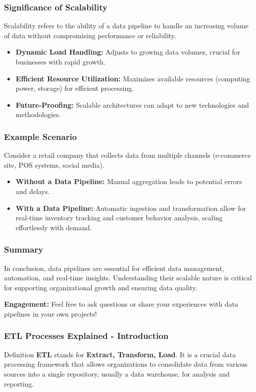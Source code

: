 \documentclass[aspectratio=169]{beamer}
\begin{document}
\begin{frame}[fragile]
    \frametitle{Significance of Scalability}
    Scalability refers to the ability of a data pipeline to handle an increasing volume of data without compromising performance or reliability.
    \begin{itemize}
        \item \textbf{Dynamic Load Handling:} Adjusts to growing data volumes, crucial for businesses with rapid growth.
        \item \textbf{Efficient Resource Utilization:} Maximizes available resources (computing power, storage) for efficient processing.
        \item \textbf{Future-Proofing:} Scalable architectures can adapt to new technologies and methodologies.
    \end{itemize}
\end{frame}

\begin{frame}[fragile]
    \frametitle{Example Scenario}
    Consider a retail company that collects data from multiple channels (e-commerce site, POS systems, social media).
    \begin{itemize}
        \item \textbf{Without a Data Pipeline:} Manual aggregation leads to potential errors and delays.
        \item \textbf{With a Data Pipeline:} Automatic ingestion and transformation allow for real-time inventory tracking and customer behavior analysis, scaling effortlessly with demand.
    \end{itemize}
\end{frame}

\begin{frame}[fragile]
    \frametitle{Summary}
    In conclusion, data pipelines are essential for efficient data management, automation, and real-time insights. Understanding their scalable nature is critical for supporting organizational growth and ensuring data quality.
    
    \vspace{10pt}
    \textbf{Engagement:} Feel free to ask questions or share your experiences with data pipelines in your own projects!
\end{frame}

\begin{frame}[fragile]
    \frametitle{ETL Processes Explained - Introduction}
    \begin{block}{Definition}
        \textbf{ETL} stands for \textbf{Extract, Transform, Load}. It is a crucial data processing framework that allows organizations to consolidate data from various sources into a single repository, usually a data warehouse, for analysis and reporting.
    \end{block}
\end{frame}
\end{document}
